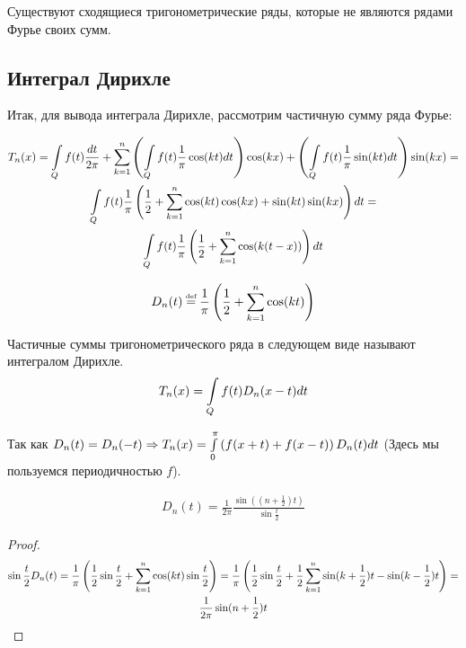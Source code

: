 \begin{nb}
	Существуют сходящиеся тригонометрические ряды, которые не являются рядами Фурье своих сумм.
\end{nb}

\newpage

\subsection{Интеграл Дирихле}

Итак, для вывода интеграла Дирихле, рассмотрим частичную сумму ряда Фурье:

\begin{gather*}
	T_n(x) = \int\limits_{Q}f(t)\frac{dt}{2\pi} + 
	\sum\limits_{k = 1}^{n} \left( \int\limits_{Q} f(t)\frac{1}{\pi}\cos(kt)dt\right) \cos(kx) + 
					 \left(	\int\limits_{Q} f(t)\frac{1}{\pi}\sin(kt)dt\right) \sin(kx) = \\
	\int\limits_{Q}f(t)\frac{1}{\pi} 
	\left(\frac{1}{2} + \sum\limits_{k = 1}^{n} \cos(kt)\cos(kx) + \sin(kt)\sin(kx) \right)dt = \\
	\int\limits_{Q}f(t) \frac{1}{\pi} \left( \frac{1}{2} + \sum\limits_{k = 1}^{n} \cos(k(t - x))\right)dt
\end{gather*}

\begin{definition}
	\begin{gather*}
		D_n(t) \defeq \frac{1}{\pi} \left( \frac{1}{2} + \sumlr{k = 1}{n} \cos(kt)\right)
	\end{gather*}
\end{definition}

\begin{definition}
	Частичные суммы тригонометрического ряда в следующем виде называют интегралом Дирихле.
	\begin{gather*}
		T_n(x) = \int\limits_{Q} f(t) D_n(x - t)dt
	\end{gather*}
\end{definition}

Так как $D_n(t) = D_n(-t) \Rightarrow 
T_n(x) = \int\limits_{0}^{\pi} \left( f(x + t ) + f(x -t )\right)D_n(t)dt$ 
(Здесь мы пользуемся периодичностью $f$).

\begin{statement}
	\begin{gather*}
		D_n(t) = \frac{1}{2\pi}\frac{\sin((n + \frac{1}{2})t)}{\sin\frac{t}{2}}
	\end{gather*}
\end{statement}

\begin{proof}
	\begin{gather*}
		\sin\frac{t}{2}D_n(t) =
		\frac{1}{\pi} \left( \frac{1}{2}\sin\frac{t}{2} +
		\sum\limits_{k = 1}^{n} \cos(kt)\sin\frac{t}{2}\right) = 
		\frac{1}{\pi} \left( \frac{1}{2}\sin\frac{t}{2}+ 
		\frac{1}{2}\sum\limits_{k = 1}^{n} \sin(k + \frac{1}{2})t - \sin(k - \frac{1}{2})t\right) = \\
		\frac{1}{2\pi}\sin(n + \frac{1}{2})t
	\end{gather*}
\end{proof}


